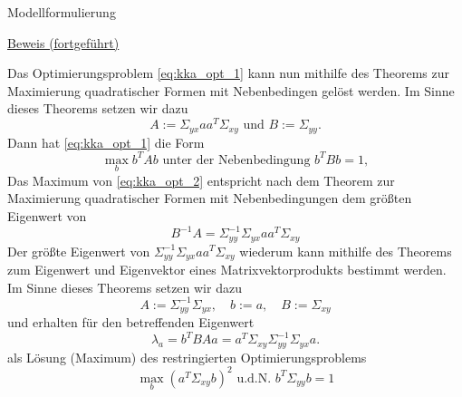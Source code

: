 \documentclass[
  8pt,
  ignorenonframetext,
]{beamer}
\begin{document}
\begin{frame}{Modellformulierung}
\protect\hypertarget{modellformulierung-6}{}
\footnotesize

\underline{Beweis (fortgeführt)}

Das Optimierungsproblem \eqref{eq:kka_opt_1} kann nun mithilfe des
Theorems zur Maximierung quadratischer Formen mit Nebenbedingen gelöst
werden. Im Sinne dieses Theorems setzen wir dazu \begin{equation}
A := \Sigma_{yx}aa^T\Sigma_{xy} \mbox{ und } B := \Sigma_{yy}.
\end{equation} Dann hat \eqref{eq:kka_opt_1} die Form
\begin{equation}\label{eq:kka_opt_2}
\max_{b} b^TAb
\mbox{ unter der Nebenbedingung }
b^TBb = 1,
\end{equation} Das Maximum von \eqref{eq:kka_opt_2} entspricht nach dem
Theorem zur Maximierung quadratischer Formen mit Nebenbedingungen dem
größten Eigenwert von \begin{equation}
B^{-1}A = \Sigma_{yy}^{-1}\Sigma_{yx}aa^T\Sigma_{xy}
\end{equation} Der größte Eigenwert von
\(\Sigma_{yy}^{-1}\Sigma_{yx}aa^T\Sigma_{xy}\) wiederum kann mithilfe
des Theorems zum Eigenwert und Eigenvektor eines Matrixvektorprodukts
bestimmt werden. Im Sinne dieses Theorems setzen wir dazu
\begin{equation}
A := \Sigma_{yy}^{-1}\Sigma_{yx},\quad b := a,\quad B := \Sigma_{xy}
\end{equation} und erhalten für den betreffenden Eigenwert
\begin{equation}
\lambda_a = b^TBAa = a^T\Sigma_{xy}\Sigma_{yy}^{-1}\Sigma_{yx}a.
\end{equation} als Lösung (Maximum) des restringierten
Optimierungsproblems \begin{equation}
\max_{b} \left(a^T\Sigma_{xy}b\right)^2 \mbox{ u.d.N. } b^T\Sigma_{yy}b = 1
\end{equation}
\end{frame}
\end{document}
